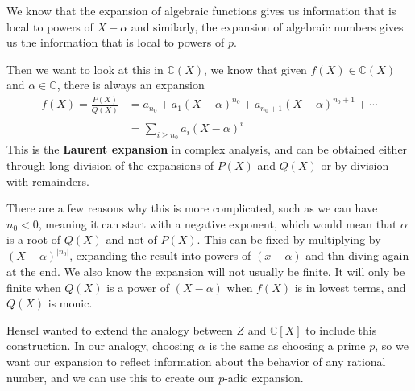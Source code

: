 \documentclass[11pt]{article}
\newcommand{\C}{\mathbb{C}}
\newcommand{\padic}{$p$-adic }
\begin{document}
We know that the expansion of algebraic functions gives us information that is local to powers of $X-\alpha$ and similarly, the expansion of algebraic numbers gives us the information that is local to powers of $p$.

Then we want to look at this in $\C(X)$, we know that given $f(X) \in \C(X)$ and $\alpha \in\C$, there is always an expansion
\begin{align*}
  f(X) = \frac{P(X)}{Q(X)} & = a_{n_0} +a_1(X-\alpha)^{n_0}+a_{n_0+1}(X-\alpha)^{n_0+1} +\cdots \\
                           & = \sum_{i\geq n_0} a_i(X-\alpha)^i
\end{align*}
This is the \textbf{Laurent expansion} in complex analysis, and can be obtained either through long division of the expansions of $P(X)$ and $Q(X)$ or by division with remainders.

There are a few reasons why this is more complicated, such as we can have $n_0<0$, meaning it can start with a negative exponent, which would mean that $\alpha$ is a root of $Q(X)$ and not of $P(X)$. This can be fixed by multiplying by $(X-\alpha)^{|n_0|}$, expanding the result into powers of $(x-\alpha)$ and thn diving again at the end. We also know the expansion will not usually be finite. It will only be finite when $Q(X)$ is a power of $(X-\alpha)$ when $f(X)$ is in lowest terms, and $Q(X)$ is monic.

Hensel wanted to extend the analogy between $Z$ and $\C[X]$ to include this construction. In our analogy, choosing $\alpha$ is the same as choosing a prime $p$, so we want our expansion to reflect information about the behavior of any rational number, and we can use this to create our \padic expansion.



\end{document}
